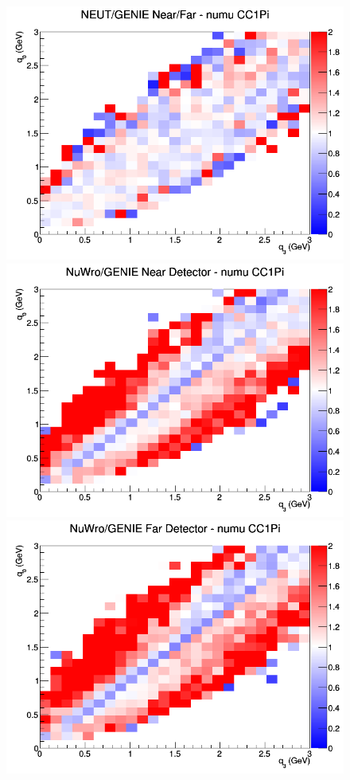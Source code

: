 \documentclass[12pt]{article}
\begin{document}
\begin{figure}[h]
\endminipage
{}
\includegraphics[width=\linewidth]{eff_q0_q3/LAr/ratios/CC1Pi_NEUT_GENIE_numu_NF_q3_q0.png}
\endminipage
\newline
{}
\includegraphics[width=\linewidth]{eff_q0_q3/LAr/ratios/CC1Pi_NuWro_GENIE_numu_near_q3_q0.png}
\endminipage
{}
\includegraphics[width=\linewidth]{eff_q0_q3/LAr/ratios/CC1Pi_NuWro_GENIE_numu_far_q3_q0.png}

\end{figure}
\end{document}
